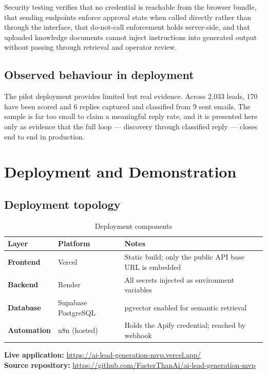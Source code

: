 \documentclass[11pt,a4paper]{report}
\begin{document}
Security testing verifies that no credential is reachable from the browser bundle, that sending endpoints enforce approval state when called directly rather than through the interface, that do-not-call enforcement holds server-side, and that uploaded knowledge documents cannot inject instructions into generated output without passing through retrieval and operator review.

\section{Observed behaviour in deployment}
The pilot deployment provides limited but real evidence. Across 2{,}033 leads, 170 have been scored and 6 replies captured and classified from 9 sent emails. The sample is far too small to claim a meaningful reply rate, and it is presented here only as evidence that the full loop --- discovery through classified reply --- closes end to end in production.

\chapter{Deployment and Demonstration}
\section{Deployment topology}
\begin{table}[H]
\centering
\caption{Deployment components}
\small
\begin{tabularx}{\textwidth}{>{\bfseries}p{3.0cm} p{3.6cm} X}
\toprule
Layer & Platform & Notes \\
\midrule
Frontend & Vercel & Static build; only the public API base URL is embedded \\
Backend & Render & All secrets injected as environment variables \\
Database & Supabase PostgreSQL & pgvector enabled for semantic retrieval \\
Automation & n8n (hosted) & Holds the Apify credential; reached by webhook \\
\bottomrule
\end{tabularx}
\end{table}

\begin{infobox}
\textbf{Live application:} \url{https://ai-lead-generation-mvp.vercel.app/}\\
\textbf{Source repository:} \url{https://github.com/FasterThanAi/ai-lead-generation-mvp}
\end{infobox}
\end{document}
